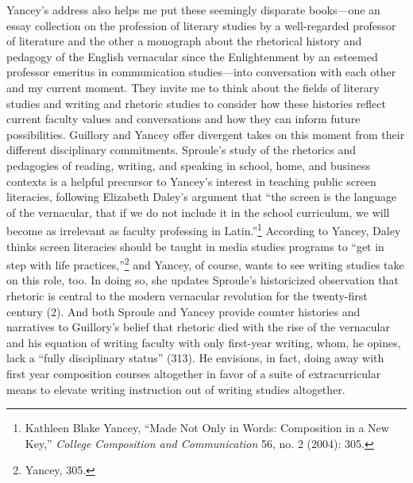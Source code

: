 \documentclass{tufte-handout}
\begin{document}
Yancey's address also helps me put these seemingly disparate books---one
an essay collection on the profession of literary studies by a
well-regarded professor of literature and the other a monograph about
the rhetorical history and pedagogy of the English vernacular since the
Enlightenment by an esteemed professor emeritus in communication
studies---into conversation with each other and my current moment. They
invite me to think about the fields of literary studies and writing and
rhetoric studies to consider how these histories reflect current faculty
values and conversations and how they can inform future possibilities.
Guillory and Yancey offer divergent takes on this moment from their
different disciplinary commitments. Sproule's study of the rhetorics and
pedagogies of reading, writing, and speaking in school, home, and
business contexts is a helpful precursor to Yancey's interest in
teaching public screen literacies, following Elizabeth Daley's argument
that ``the screen is the language of the vernacular, that if we do not
include it in the school curriculum, we will become as irrelevant as
faculty professing in Latin.''\footnote{Kathleen Blake Yancey, ``Made
  Not Only in Words: Composition in a New Key,'' \emph{College
  Composition and Communication} 56, no. 2 (2004): 305.} According to
Yancey, Daley thinks screen literacies should be taught in media studies
programs to ``get in step with life practices,''\footnote{Yancey, 305.}
and Yancey, of course, wants to see writing studies take on this role,
too. In doing so, she updates Sproule's historicized observation that
rhetoric is central to the modern vernacular revolution for the
twenty-first century (2). And both Sproule and Yancey provide counter
histories and narratives to Guillory's belief that rhetoric died with
the rise of the vernacular and his equation of writing faculty with only
first-year writing, whom, he opines, lack a ``fully disciplinary
status'' (313). He envisions, in fact, doing away with first year
composition courses altogether in favor of a suite of extracurricular
means to elevate writing instruction out of writing studies altogether.
\end{document}

